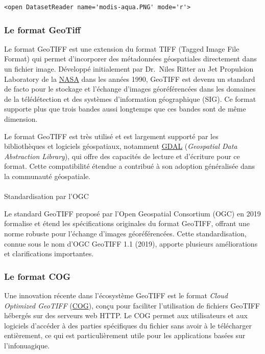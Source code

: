 \documentclass[
  french,
  11pt,
  letterpaper,
  open=any,
  twoside=false,
  french]{scrbook}
\makeatletter
\let\oldparagraph\paragraph
\renewcommand{\paragraph}{
    \@ifstar
      \xxxParagraphStar
      \xxxParagraphNoStar
  }
\newcommand{\xxxParagraphStar}[1]{\oldparagraph*{#1}\mbox{}}
\newcommand{\xxxParagraphNoStar}[1]{\oldparagraph{#1}\mbox{}}
\makeatother
\begin{document}
\begin{verbatim}
<open DatasetReader name='modis-aqua.PNG' mode='r'>
\end{verbatim}

\subsubsection{Le format GeoTiff}\label{le-format-geotiff}

Le format GeoTIFF est une extension du format TIFF (Tagged Image File
Format) qui permet d'incorporer des métadonnées géospatiales directement
dans un fichier image. Développé initialement par Dr.~Niles Ritter au
Jet Propulsion Laboratory de la
\href{https://www.earthdata.nasa.gov/esdis/esco/standards-and-practices/geotiff}{NASA}
dans les années 1990, GeoTIFF est devenu un standard de facto pour le
stockage et l'échange d'images géoréférencées dans les domaines de la
télédétection et des systèmes d'information géographique (SIG). Ce
format supporte plus que trois bandes aussi longtemps que ces bandes
sont de même dimension.

Le format GeoTIFF est très utilisé et est largement supporté par les
bibliothèques et logiciels géospatiaux, notamment
\href{https://gdal.org}{GDAL} (\emph{Geospatial Data Abstraction
Library}), qui offre des capacités de lecture et d'écriture pour ce
format. Cette compatibilité étendue a contribué à son adoption
généralisée dans la communauté géospatiale.

\paragraph{Standardisation par l'OGC}\label{standardisation-par-logc}

Le standard GeoTIFF proposé par l'Open Geospatial Consortium (OGC) en
2019 formalise et étend les spécifications originales du format GeoTIFF,
offrant une norme robuste pour l'échange d'images géoréférencées. Cette
standardisation, connue sous le nom d'OGC GeoTIFF 1.1 (2019), apporte
plusieurs améliorations et clarifications importantes.

\subsubsection{Le format COG}\label{le-format-cog}

Une innovation récente dans l'écosystème GeoTIFF est le format
\emph{Cloud Optimized GeoTIFF} (\href{http://cogeo.org/}{COG}), conçu
pour faciliter l'utilisation de fichiers GeoTIFF hébergés sur des
serveurs web HTTP. Le COG permet aux utilisateurs et aux logiciels
d'accéder à des parties spécifiques du fichier sans avoir à le
télécharger entièrement, ce qui est particulièrement utile pour les
applications basées sur l'infonuagique.
\end{document}
